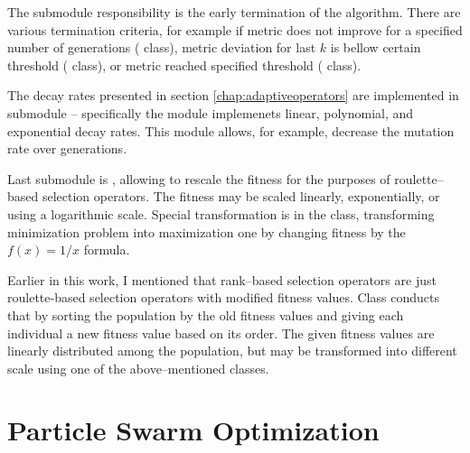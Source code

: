 The  submodule responsibility is the early termination of the algorithm. There are various termination criteria, for example if metric does not improve for a specified number of generations ( class), metric deviation for last $k$ is bellow certain threshold ( class), or metric reached specified threshold ( class).

The decay rates presented in section \ref{chap:adaptiveoperators} are implemented in submodule  -- specifically the module implemenets linear, polynomial, and exponential decay rates. This module allows, for example, decrease the mutation rate over generations.

Last submodule is , allowing to rescale the fitness for the purposes of roulette--based selection operators. The fitness may be scaled linearly, exponentially, or using a logarithmic scale. Special transformation is in the  class, transforming minimization problem into maximization one by changing fitness by the $f(x)=1/x$ formula.

Earlier in this work, I mentioned that rank--based selection operators are just roulette-based selection operators with modified fitness values. Class  conducts that by sorting the population by the old fitness values and giving each individual a new fitness value based on its order. The given fitness values are linearly distributed among the population, but may be transformed into different scale using one of the above--mentioned classes.




\section{Particle Swarm Optimization}

